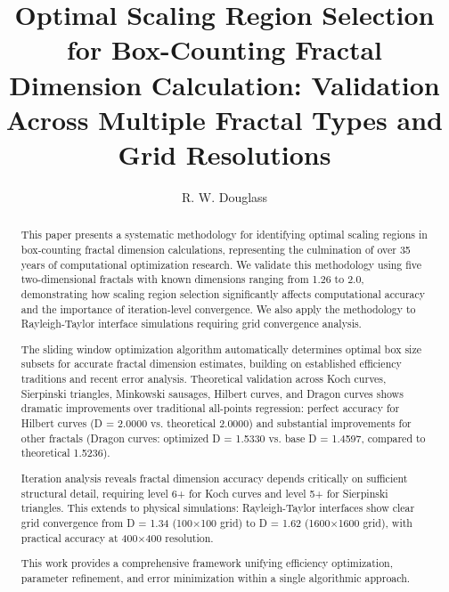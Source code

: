 \documentclass[preprint,12pt]{elsarticle}
\begin{document}
\begin{frontmatter}

\title{Optimal Scaling Region Selection for Box-Counting Fractal Dimension Calculation: Validation Across Multiple Fractal Types and Grid Resolutions}

\author{R. W. Douglass}



\begin{abstract}
This paper presents a systematic methodology for identifying optimal scaling regions in box-counting fractal dimension calculations, representing the culmination of over 35 years of computational optimization research. We validate this methodology using five two-dimensional fractals with known dimensions ranging from 1.26 to 2.0, demonstrating how scaling region selection significantly affects computational accuracy and the importance of iteration-level convergence. We also apply the methodology to Rayleigh-Taylor interface simulations requiring grid convergence analysis.

The sliding window optimization algorithm automatically determines optimal box size subsets for accurate fractal dimension estimates, building on established efficiency traditions and recent error analysis. Theoretical validation across Koch curves, Sierpinski triangles, Minkowski sausages, Hilbert curves, and Dragon curves shows dramatic improvements over traditional all-points regression: perfect accuracy for Hilbert curves (D = 2.0000 vs. theoretical 2.0000) and substantial improvements for other fractals (Dragon curves: optimized D = 1.5330 vs. base D = 1.4597, compared to theoretical 1.5236).

Iteration analysis reveals fractal dimension accuracy depends critically on sufficient structural detail, requiring level 6+ for Koch curves and level 5+ for Sierpinski triangles. This extends to physical simulations: Rayleigh-Taylor interfaces show clear grid convergence from D = 1.34 (100×100 grid) to D = 1.62 (1600×1600 grid), with practical accuracy at 400×400 resolution.

This work provides a comprehensive framework unifying efficiency optimization, parameter refinement, and error minimization within a single algorithmic approach.


\end{abstract}
\end{frontmatter}
\end{document}
